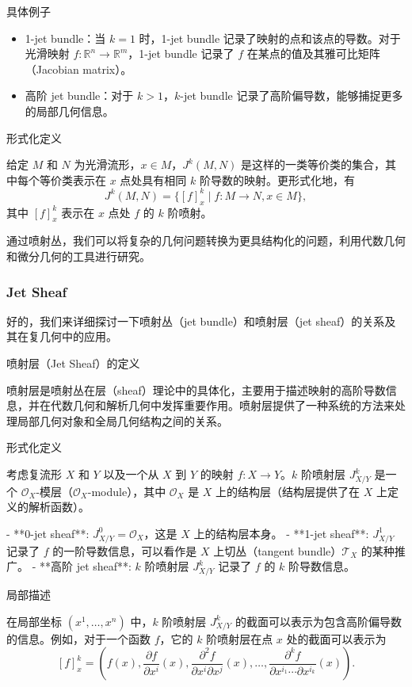 \documentclass[lang=cn,12pt,fontset=none,a4paper]{beautybook}
\begin{document}
具体例子
\begin{itemize}
   \item 1-jet bundle：当 $k=1$ 时，1-jet bundle 记录了映射的点和该点的导数。对于光滑映射 $f: \mathbb{R}^n \to \mathbb{R}^m$，1-jet bundle 记录了 $f$ 在某点的值及其雅可比矩阵（Jacobian matrix）。
   \item 高阶 jet bundle：对于 $k > 1$，$k$-jet bundle 记录了高阶偏导数，能够捕捉更多的局部几何信息。
\end{itemize}


形式化定义

给定 $M$ 和 $N$ 为光滑流形，$x \in M$，$J^k(M, N)$ 是这样的一类等价类的集合，其中每个等价类表示在 $x$ 点处具有相同 $k$ 阶导数的映射。更形式化地，有
$$ J^k(M, N) = \{ [f]_x^k \mid f: M \to N, x \in M \}, $$
其中 $[f]_x^k$ 表示在 $x$ 点处 $f$ 的 $k$ 阶喷射。

通过喷射丛，我们可以将复杂的几何问题转换为更具结构化的问题，利用代数几何和微分几何的工具进行研究。

\subsubsection*{Jet Sheaf}
好的，我们来详细探讨一下喷射丛（jet bundle）和喷射层（jet sheaf）的关系及其在复几何中的应用。

喷射层（Jet Sheaf）的定义

喷射层是喷射丛在层（sheaf）理论中的具体化，主要用于描述映射的高阶导数信息，并在代数几何和解析几何中发挥重要作用。喷射层提供了一种系统的方法来处理局部几何对象和全局几何结构之间的关系。

形式化定义

考虑复流形 $X$ 和 $Y$ 以及一个从 $X$ 到 $Y$ 的映射 $f: X \to Y$。$k$ 阶喷射层 $J^k_{X/Y}$ 是一个 $\mathcal{O}_X$-模层（$\mathcal{O}_X$-module），其中 $\mathcal{O}_X$ 是 $X$ 上的结构层（结构层提供了在 $X$ 上定义的解析函数）。

- **0-jet sheaf**: $J^0_{X/Y} = \mathcal{O}_X$，这是 $X$ 上的结构层本身。
- **1-jet sheaf**: $J^1_{X/Y}$ 记录了 $f$ 的一阶导数信息，可以看作是 $X$ 上切丛（tangent bundle）$\mathcal{T}_X$ 的某种推广。
- **高阶 jet sheaf**: $k$ 阶喷射层 $J^k_{X/Y}$ 记录了 $f$ 的 $k$ 阶导数信息。

局部描述

在局部坐标 $(x^1, \ldots, x^n)$ 中，$k$ 阶喷射层 $J^k_{X/Y}$ 的截面可以表示为包含高阶偏导数的信息。例如，对于一个函数 $f$，它的 $k$ 阶喷射层在点 $x$ 处的截面可以表示为
$$ [f]_x^k = \left( f(x), \frac{\partial f}{\partial x^i}(x), \frac{\partial^2 f}{\partial x^i \partial x^j}(x), \ldots, \frac{\partial^k f}{\partial x^{i_1} \cdots \partial x^{i_k}}(x) \right). $$
\end{document}
